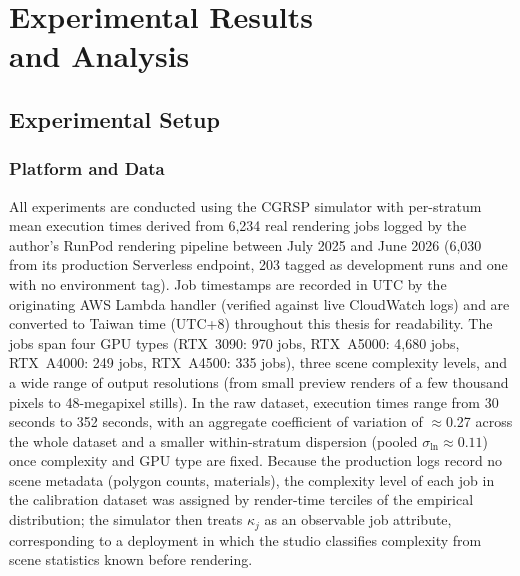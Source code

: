 \chapter[Experimental Results and Analysis]{\texorpdfstring{Experimental Results\\and Analysis}{Experimental Results and Analysis}}
\label{chap:experiments}
{%

\section{Experimental Setup}
\label{sec:experimental-setup}

\subsection{Platform and Data}
\label{ssec:platform-and-data}

All experiments are conducted using the CGRSP simulator with per-stratum mean execution times derived from 6,234 real rendering jobs logged by the author's RunPod rendering pipeline between July 2025 and June 2026 (6,030 from its production Serverless endpoint, 203 tagged as development runs and one with no environment tag). Job timestamps are recorded in UTC by the originating AWS Lambda handler (verified against live CloudWatch logs) and are converted to Taiwan time (UTC+8) throughout this thesis for readability. The jobs span four GPU types (RTX~3090: 970 jobs, RTX~A5000: 4,680 jobs, RTX~A4000: 249 jobs, RTX~A4500: 335 jobs), three scene complexity levels, and a wide range of output resolutions (from small preview renders of a few thousand pixels to 48-megapixel stills). In the raw dataset, execution times range from 30 seconds to 352 seconds, with an aggregate coefficient of variation of $\approx$0.27 across the whole dataset and a smaller within-stratum dispersion (pooled $\sigma_{\ln} \approx 0.11$) once complexity and GPU type are fixed. Because the production logs record no scene metadata (polygon counts, materials), the complexity level of each job in the calibration dataset was assigned by render-time terciles of the empirical distribution; the simulator then treats $\kappa_j$ as an observable job attribute, corresponding to a deployment in which the studio classifies complexity from scene statistics known before rendering.

}
